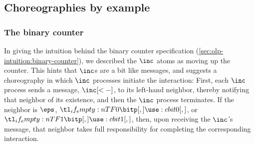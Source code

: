 \documentclass[
  class=../hdeyoung-proposal,
  crop=false
]{standalone}
\begin{document}
\subsection{Choreographies by example}\label{sec:chor-by-example}

\subsubsection{The binary counter}\label{sec:chor-example-counter}

In giving the intuition behind the binary counter specification (\cref{sec:olp-intuition:binary-counter}), we described the $\inc$ atoms %
as moving up the counter.
This hints that $\inc$s are a bit like messages, and suggests a choreography in which $\inc$ processes initiate the interaction:
First, each $\inc$ process sends a message, $\inc[<-]$, to its left-hand neighbor, thereby notifying that neighbor of its existence, and then the $\inc$ process terminates.
If the neighbor is $\eps$, $\bit{0}$, or $\bit{1}$, then, upon receiving the $\inc$'s message, that neighbor takes full responsibility for completing the corresponding interaction.
\end{document}
